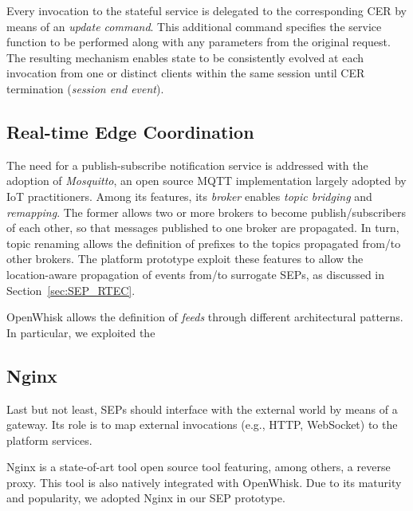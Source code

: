 Every invocation to the stateful service is delegated to the corresponding CER by means of an \textit{update command}. This additional command specifies the service function to be performed along with any parameters from the original request. The resulting mechanism enables state to be consistently evolved at each invocation from one or distinct clients within the same session until CER termination (\textit{session end event}).


\subsection{Real-time Edge Coordination}


The need for a publish-subscribe notification service is addressed with the adoption of \textit{Mosquitto}, an open source MQTT implementation largely adopted by IoT practitioners. %
Among its features, its \textit{broker} enables \textit{topic bridging} and \textit{remapping}. The former allows two or more brokers to become publish/subscribers of each other, so that messages published to one broker are propagated. In turn, topic renaming allows the definition of prefixes to the topics propagated from/to other brokers. The platform prototype exploit these features to allow the location-aware propagation of events from/to surrogate SEPs, as discussed in Section~\ref{sec:SEP_RTEC}. %

OpenWhisk allows the definition of \textit{feeds} through different architectural patterns. In particular, we exploited the 

\subsection{Nginx}\label{sec:prototype_Nginx}

Last but not least, SEPs should interface with the external world by means of a gateway. Its role is to map external invocations (e.g., HTTP, WebSocket) to the platform services. %

Nginx is a state-of-art tool open source tool featuring, among others, a reverse proxy. This tool is also natively integrated with OpenWhisk. 
Due to its maturity and popularity, we adopted Nginx in our SEP prototype.



